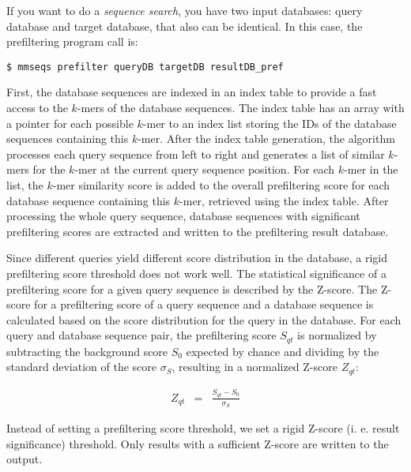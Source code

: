 \documentclass[11pt,a4paper]{report}
\begin{document}
If you want to do a \emph{sequence search}, you have two input databases:
query database and target database, that also can be identical. In
this case, the prefiltering program call is:

\texttt{\$ mmseqs prefilter queryDB targetDB resultDB\_pref }

First, the database sequences are indexed in an index table to provide
a fast access to the $k$-mers of the database sequences. The index
table has an array with a pointer for each possible $k$-mer to an
index list storing the IDs of the database sequences containing this
$k$-mer. After the index table generation, the algorithm processes
each query sequence from left to right and generates a list of similar
$k$-mers for the $k$-mer at the current query sequence position.
For each $k$-mer in the list, the $k$-mer similarity score is added
to the overall prefiltering score for each database sequence containing
this $k$-mer, retrieved using the index table. After processing the
whole query sequence, database sequences with significant prefiltering
scores are extracted and written to the prefiltering result database. 

Since different queries yield different score distribution in the
database, a rigid prefiltering score threshold does not work well.
The statistical significance of a prefiltering score for a given query
sequence is described by the Z-score. The Z-score for a prefiltering
score of a query sequence and a database sequence is calculated based
on the score distribution for the query in the database. For each
query and database sequence pair, the prefiltering score $S_{qt}$
is normalized by subtracting the background score $S_{0}$ expected
by chance and dividing by the standard deviation of the score $\sigma_{S}$,
resulting in a normalized Z-score $Z_{qt}$:

\begin{eqnarray*}
Z_{qt} & = & \frac{S_{qt}-S_{0}}{\sigma_{S}}\end{eqnarray*}


Instead of setting a prefiltering score threshold, we set a rigid
Z-score (i. e. result significance) threshold. Only results with a
sufficient Z-score are written to the output.
\end{document}
